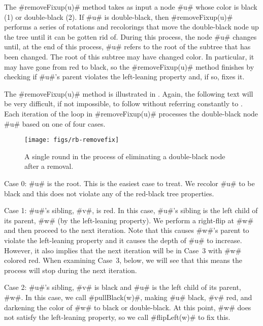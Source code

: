 The #removeFixup(u)# method takes as input a node #u# whose color is black
(1) or double-black (2).  If #u# is double-black, then #removeFixup(u)#
performs a series of rotations and recolorings that move the double-black
node up the tree until it can be gotten rid of.  During this process,
the node #u# changes until, at the end of this process, #u# refers to the
root of the subtree that has been changed.  The root of this subtree may
have changed color.  In particular, it may have gone from red to black,
so the #removeFixup(u)# method finishes by checking if #u#'s parent
violates the left-leaning property and, if so, fixes it.

The #removeFixup(u)# method is illustrated in .
Again, the following text will be very difficult, if not impossible,
to follow without referring constantly to .
Each iteration of the loop in #removeFixup(u)# processes the double-black node #u# based on one of four cases.

\begin{figure}
  \begin{center}
    \texttt{[image: figs/rb-removefix]}
  \end{center}
  \caption{A single round in the process of eliminating a double-black node
   after a removal.}
\end{figure}

\noindent
Case 0: #u# is the root.  This is the easiest case to treat.  We recolor #u# to be black and this does not violate any of the red-black tree properties.

\noindent 
Case 1: #u#'s sibling, #v#, is red.  In this case, #u#'s sibling is the
left child of its parent, #w# (by the left-leaning property).  We perform
a right-flip at #w# and then proceed to the next iteration.  Note that
this causes #w#'s parent to violate the left-leaning property and it
causes the depth of #u# to increase.  However, it also implies that the
next iteration will be in Case~3 with #w# colored red.  When examining
Case~3, below, we will see that this means the process will stop during
the next iteration.

\noindent
Case 2: #u#'s sibling, #v# is black and #u# is the left child of its
parent, #w#.  In this case, we call #pullBlack(w)#, making #u# black,
#v# red, and darkening the color of #w# to black or double-black.
At this point, #w# does not satisfy the left-leaning property, so we
call #flipLeft(w)# to fix this.

